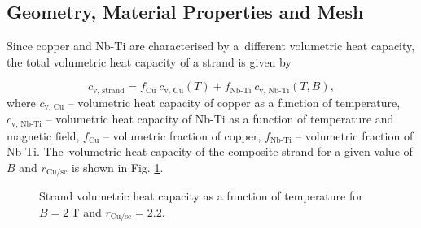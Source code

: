 
\subsection{Geometry, Material Properties and Mesh}

Since copper and Nb-Ti are characterised by a~different volumetric heat capacity, the total volumetric heat capacity of a strand is given by

\begin{equation}
    c_\text{v, strand} = f_\text{Cu} ~ c_\text{v, Cu}(T) + f_\text{Nb-Ti} ~ c_\text{v, Nb-Ti}(T,B),
    \label{eqn: cv_equiv}
\end{equation}
where $c_\text{v, Cu}$ -- volumetric heat capacity of copper as a function of temperature, $c_\text{v, Nb-Ti}$ -- volumetric heat capacity of Nb-Ti as a function of temperature and magnetic field, $f_\text{Cu}$ -- volumetric fraction of copper, $f_\text{Nb-Ti}$ -- volumetric fraction of Nb-Ti. The~volumetric heat capacity of the composite strand for a given value of $B$ and $r_\text{Cu/sc}$ is shown in Fig. \ref{fig:eq_wind_cp}.

\begin{figure}[H]
\centering
    \caption{Strand volumetric heat capacity as a function of temperature for $B=2~\text{T}$ and $r_\text{Cu/sc}=2.2$.}
    \label{fig:eq_wind_cp}
\end{figure}

